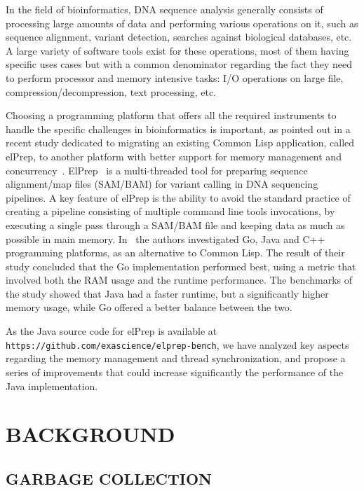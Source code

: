 \documentclass[a4paper,twoside]{article}
\begin{document}
In the field of bioinformatics, DNA sequence analysis \cite{doring:2008} generally consists of processing large amounts of data and performing
various operations on it,
such as sequence alignment, variant detection, searches against biological databases, etc.
A large variety of software tools exist for these operations, most of them having specific uses cases but with a common
denominator regarding the fact they need to perform processor and memory intensive tasks: I/O operations on large file,
compression/decompression, text processing, etc.

Choosing a programming platform that offers all the required instruments to handle the specific challenges in
bioinformatics is important,
as pointed out in a recent study dedicated to migrating an existing Common Lisp application, called elPrep, 
to another platform with better support for memory management and concurrency~\cite{costanza:2019}.
ElPrep~\cite{herzeel:2019} is a multi-threaded tool for preparing sequence alignment/map files (SAM/BAM)
for variant calling in DNA sequencing pipelines. 
A key feature of elPrep is the ability to avoid the standard practice of creating a pipeline consisting of multiple
command line tools invocations,
by executing a single pass through a SAM/BAM file and keeping data as much as possible in main memory.
In~\cite{costanza:2019} the authors investigated Go, Java and C++ programming platforms, as an alternative to Common Lisp.
The result of their study concluded that the Go implementation performed best, using a metric that involved both the
RAM usage and the runtime performance.
The benchmarks of the study showed that Java had a faster runtime, but a significantly higher memory usage, while Go
offered a better balance between the two.

As the Java source code for elPrep is available at 
{\small {\texttt{https://github.com/exascience/elprep-bench}}}, we have
analyzed key aspects regarding the memory management and thread synchronization, and propose a series of improvements
that could increase significantly the performance of the Java implementation.


\section{\uppercase{Background}}
\label{background}

\subsection{\uppercase{Garbage Collection}}
\label{background:gc}
\end{document}
